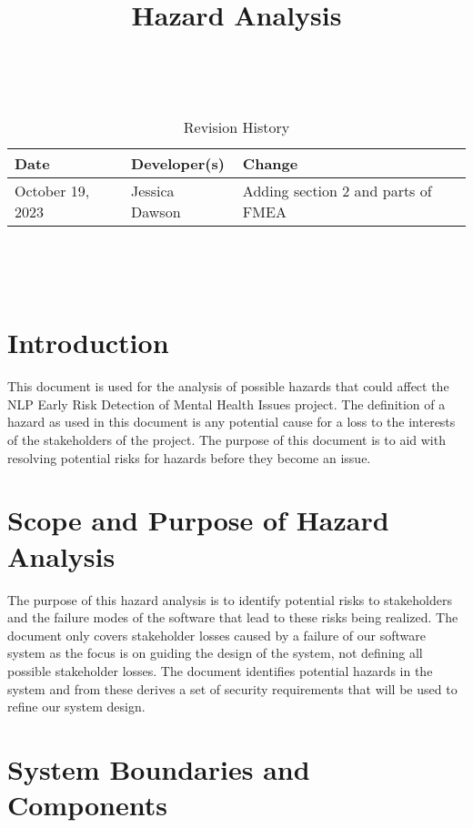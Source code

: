 \documentclass{article}
\title{Hazard Analysis\\\progname}
\author{\authname}
\date{}
\begin{document}
\maketitle
\thispagestyle{empty}

~\newpage



\begin{table}[hp]
\caption{Revision History} \label{TblRevisionHistory}
\begin{tabularx}{\textwidth}{llX}
\toprule
\textbf{Date} & \textbf{Developer(s)} & \textbf{Change}\\
\midrule
October 19, 2023 & Jessica Dawson & Adding section 2 and parts of FMEA\\
\bottomrule
\end{tabularx}
\end{table}

~\newpage

\tableofcontents

~\newpage


\section{Introduction}

This document is used for the analysis of possible hazards that could affect the NLP Early Risk Detection of Mental Health Issues project. The definition of a hazard as used in this document is any potential cause for a loss to the interests of the stakeholders of the project. The purpose of this document is to aid with resolving potential risks for hazards before they become an issue.

\section{Scope and Purpose of Hazard Analysis}

The purpose of this hazard analysis is to identify potential risks to stakeholders and the failure modes of the software that lead to these risks being realized. The document only covers stakeholder losses caused by a failure of our software system as the focus is on guiding the design of the system, not defining all possible stakeholder losses. The document identifies potential hazards in the system and from these derives a set of security requirements that will be used to refine our system design.

\section{System Boundaries and Components}
\end{document}
